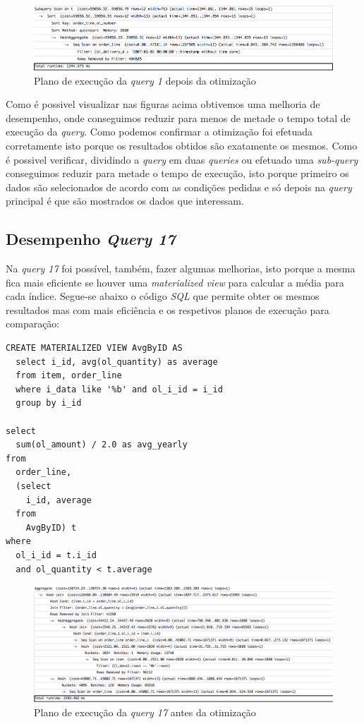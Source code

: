 \begin{figure}[ht!]
\centering
\includegraphics[width=\textwidth]{img/00_query1_ant}
\caption{Plano de execução da \textit{query 1} depois da otimização \label{overflow}}
\end{figure}

Como é possivel visualizar nas figuras acima obtivemos uma melhoria de desempenho, onde conseguimos reduzir para menos de metade o tempo total de execução da \textit{query}. Como podemos confirmar a otimização foi efetuada corretamente isto porque os resultados obtidos são exatamente os mesmos. Como é possivel verificar, dividindo a \textit{query} em duas \textit{queries} ou efetuado uma \textit{sub-query} conseguimos reduzir para metade o tempo de execução, isto porque primeiro os dados são selecionados de acordo com as condições pedidas e só depois na \textit{query} principal é que são mostrados os dados que interessam.

\newpage

\subsection{Desempenho \textit{Query 17}}

Na \textit{query 17} foi possível, também, fazer algumas melhorias, isto porque a mesma fica mais eficiente se houver uma \textit{materialized view} para calcular a média para cada índice. Segue-se abaixo o código \textit{SQL} que permite obter os mesmos resultados mas com mais eficiência e os respetivos planos de execução para comparação:

\begin{verbatim}
CREATE MATERIALIZED VIEW AvgByID AS
  select i_id, avg(ol_quantity) as average
  from item, order_line
  where i_data like '%b' and ol_i_id = i_id
  group by i_id

select
  sum(ol_amount) / 2.0 as avg_yearly
from
  order_line,
  (select
    i_id, average
  from
    AvgByID) t
where
  ol_i_id = t.i_id
  and ol_quantity < t.average
\end{verbatim}

\begin{figure}[ht!]
\centering
\includegraphics[width=\textwidth]{img/00_query17_ant}
\caption{Plano de execução da \textit{query 17} antes da otimização \label{overflow}}
\end{figure}

